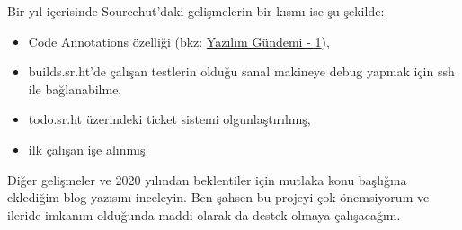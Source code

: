 \documentclass[11pt]{article}
\begin{document}
Bir yıl içerisinde Sourcehut'daki gelişmelerin bir kısmı ise şu şekilde:
\begin{itemize}
\item Code Annotations özelliği (bkz: \href{../01/yazilim-gundemi-01.pdf}{Yazılım Gündemi - 1}),
\item builds.sr.ht'de çalışan testlerin olduğu sanal makineye debug yapmak için
ssh ile bağlanabilme,
\item todo.sr.ht üzerindeki ticket sistemi olgunlaştırılmış,
\item ilk çalışan işe alınmış
\end{itemize}

Diğer gelişmeler ve 2020 yılından beklentiler için mutlaka konu başlığına
eklediğim blog yazısını inceleyin. Ben şahsen bu projeyi çok önemsiyorum ve
ileride imkanım olduğunda maddi olarak da destek olmaya çalışacağım.
\newpage
\end{document}

